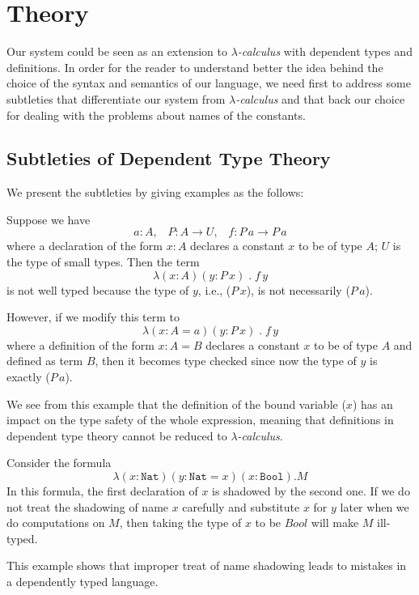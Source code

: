 \chapter{Theory} \label{chapter:theory}
Our system could be seen as an extension to \emph{$\lambda$-calculus} with dependent types and definitions. In order for the reader to understand better the idea behind the choice of the syntax and semantics of our language, we need first to address some subtleties that differentiate our system from \emph{$\lambda$-calculus} and that back our choice for dealing with the problems about names of the constants.

\section{Subtleties of Dependent Type Theory} \label{theory:subtleties}
We present the subtleties by giving examples as the follows: 

\begin{example}\label{theory:exa1}
  Suppose we have
  \[ a : A, \;\;\; P : A \to U, \;\;\; f : P \, a \to P \, a \]
  where a declaration of the form $x : A$ declares a constant $x$ to be of type $A$; $U$ is the type of small types. Then the term
  \[ \lambda (x : A) (y : P \, x) \; . \; f \, y \]
  is not well typed because the type of $y$, i.e., ($P \, x$), is not necessarily ($P \, a$).

  However, if we modify this term to
  \[ \lambda (x : A = a) (y : P \, x) \; . \; f \, y \]
  where a definition of the form $x : A = B$ declares a constant $x$ to be of type $A$ and defined as term $B$, then it becomes type checked since now the type of $y$ is exactly ($P \, a$).

  We see from this example that the definition of the bound variable ($x$) has an impact on the type safety of the whole expression, meaning that definitions in dependent type theory cannot be reduced to \emph{$\lambda$-calculus}.
\end{example}

\begin{example}\label{theory:exa2}
  Consider the formula
  \[ \lambda (x : \texttt{Nat}) (y : \texttt{Nat} = x) (x : \texttt{Bool}).M\]
  In this formula, the first declaration of $x$ is shadowed by the second one. If we do not treat the shadowing of name $x$ carefully and substitute $x$ for $y$ later when we do computations on $M$, then taking the type of $x$ to be $Bool$ will make $M$ ill-typed.

  This example shows that improper treat of name shadowing leads to mistakes in a dependently typed language.
\end{example}

